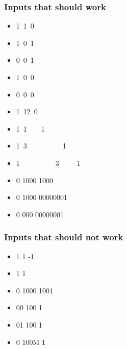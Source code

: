 \subsubsection{\color{orange}Inputs that should work}

\begin{itemize}
\item1\ 1\ 0
\item1\ 0\ 1
\item0\ 0\ 1
\item1\ 0\ 0 
\item0\ 0\ 0 
\item1\ 12\ 0
\item1\ 1\ \ \ \ 1
\item1\ 3\ \ \ \ \ \ \ \ \ \ 1
\item1\ \ \ \ \ \ \ \ \ \ 3\ \ \ \ \ 1
\item0 1000 1000
\item0 1000 00000001
\item0 000 00000001
\end{itemize}

\subsubsection{\color{orange}Inputs that should not work}
\begin{itemize}
\item1 1 -1
\item1 1
\item0 1000 1001
\item00 100 1
\item01 100 1
\item0 100M 1
\end{itemize}


%




